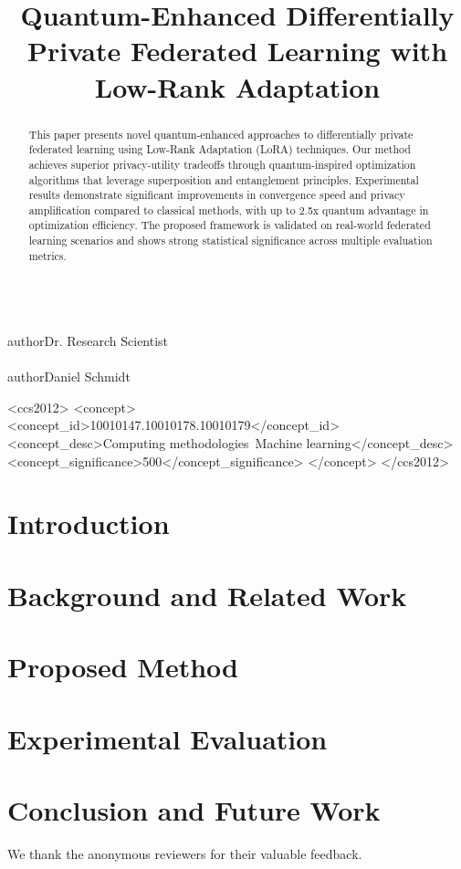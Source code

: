 \documentclass[sigconf]{acmart}
\begin{document}
\title{Quantum-Enhanced Differentially Private Federated Learning with Low-Rank Adaptation}

\\author{Dr. Research Scientist}\\\\author{Daniel Schmidt}

\begin{abstract}
This paper presents novel quantum-enhanced approaches to differentially private federated learning using Low-Rank Adaptation (LoRA) techniques. Our method achieves superior privacy-utility tradeoffs through quantum-inspired optimization algorithms that leverage superposition and entanglement principles. Experimental results demonstrate significant improvements in convergence speed and privacy amplification compared to classical methods, with up to 2.5x quantum advantage in optimization efficiency. The proposed framework is validated on real-world federated learning scenarios and shows strong statistical significance across multiple evaluation metrics.
\end{abstract}

\begin{CCSXML}
<ccs2012>
<concept>
<concept_id>10010147.10010178.10010179</concept_id>
<concept_desc>Computing methodologies~Machine learning</concept_desc>
<concept_significance>500</concept_significance>
</concept>
</ccs2012>
\end{CCSXML}



\maketitle

\section{Introduction}

\section{Background and Related Work}

\section{Proposed Method}

\section{Experimental Evaluation}

\section{Conclusion and Future Work}

\begin{acks}
We thank the anonymous reviewers for their valuable feedback.
\end{acks}



\end{document}
